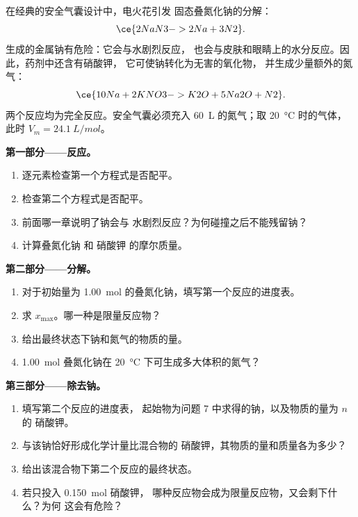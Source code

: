 \begin{problem}
\label{pb:g10:reaction-progress-table:1}
在经典的安全气囊设计中，电火花引发
固态叠氮化钠的分解：
\[
  \ce{2NaN3 -> 2Na + 3N2} .
\]
生成的金属钠有危险：它会与水剧烈反应，
也会与皮肤和眼睛上的水分反应。因此，药剂中还含有硝酸钾，
它可使钠转化为无害的氧化物，
并生成少量额外的氮气：
\[
  \ce{10Na + 2KNO3 -> K2O + 5Na2O + N2} .
\]
两个反应均为完全反应。安全气囊必须充入 \qty{60}{L}
的氮气；取 \qty{20}{\celsius} 时的气体，此时
$V_m = \qty{24.1}{L/mol}$。

\medskip
\noindent\textbf{第一部分——反应。}
\begin{enumerate}
  \item 逐元素检查第一个方程式是否配平。
  \item 检查第二个方程式是否配平。
  \item 前面哪一章说明了钠会与
        水剧烈反应？为何碰撞之后不能残留钠？
  \item 计算叠氮化钠  和
        硝酸钾  的摩尔质量。
\end{enumerate}

\medskip
\noindent\textbf{第二部分——分解。}
\begin{enumerate}[resume]
  \item 对于初始量为
        \qty{1.00}{mol} 的叠氮化钠，填写第一个反应的进度表。
  \item 求 $x_{\max}$。哪一种是限量反应物？
  \item 给出最终状态下钠和氮气的物质的量。
  \item \qty{1.00}{mol} 叠氮化钠在
        \qty{20}{\celsius} 下可生成多大体积的氮气？
\end{enumerate}

\medskip
\noindent\textbf{第三部分——除去钠。}
\begin{enumerate}[resume]
  \item 填写第二个反应的进度表，
        起始物为问题 7 中求得的钠，以及物质的量为 $n$ 的
        硝酸钾。
  \item 与该钠恰好形成化学计量比混合物的
        硝酸钾，其物质的量和质量各为多少？
  \item 给出该混合物下第二个反应的最终状态。
  \item 若只投入 \qty{0.150}{mol} 硝酸钾，
        哪种反应物会成为限量反应物，又会剩下什么？为何
        这会有危险？
\end{enumerate}


\end{problem}
